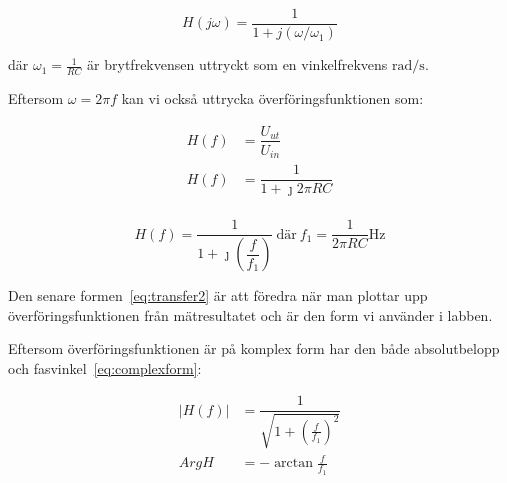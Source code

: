 \begin{equation}\label{eq:transfer}
  H(j\omega) = \dfrac{1}{1+j(\omega/\omega_1)}
\end{equation}

där $\omega_1 = \tfrac{1}{R C}$ är brytfrekvensen uttryckt som en
vinkelfrekvens $\si{\radian\per\second}$.


\par 
Eftersom $\omega = 2 \pi f$ kan vi också uttrycka överföringsfunktionen som:

\begin{equation*}
  \begin{split}
    H(f) &= \dfrac{U_{ut}}{U_{in}}        \\
    H(f) &= \dfrac{1}{1+\jmath 2 \pi R C} \\
  \end{split}
\end{equation*}

\begin{equation}\label{eq:transfer2}
  H(f) = \dfrac{1}{1+\jmath (\dfrac{f}{f_1})}\
  \text{där}\ f_1 = \dfrac{1}{2 \pi R C} \si{\Hz}
\end{equation}


\par Den senare formen~\eqref{eq:transfer2} är att föredra när man
plottar upp överföringsfunktionen från mätresultatet och är den form vi
använder i labben.

Eftersom överföringsfunktionen är på komplex form har den både absolutbelopp
och fasvinkel~\eqref{eq:complexform}:

\begin{equation}\label{eq:complexform}
  \begin{split}
    |H(f)| &= \dfrac{1}{\sqrt{1+{(\frac{f}{f_1})}^2}} \\
      ArgH &= -\arctan{\frac{f}{f_1}}
  \end{split}
\end{equation}




